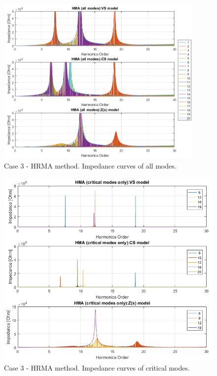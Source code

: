 \documentclass[12pt]{report} %
\begin{document}
\begin{figure}[htb]
	\centering
	\includegraphics[width=0.9\textwidth]{img/Case3/Case3_HMA_all.png}
  	\caption{Case 3 - HRMA method. Impedance curves of all modes.}
  	\label{fig:case3hrma2}
\end{figure}
\FloatBarrier

\begin{figure}[htb]
	\centering
	\includegraphics[width=1\textwidth]{img/Case3/Case3_HMA_crit.png}
  	\caption{Case 3 - HRMA method. Impedance curves of critical modes.}
  	\label{fig:case3hrma3}
\end{figure}
\FloatBarrier
\end{document}
